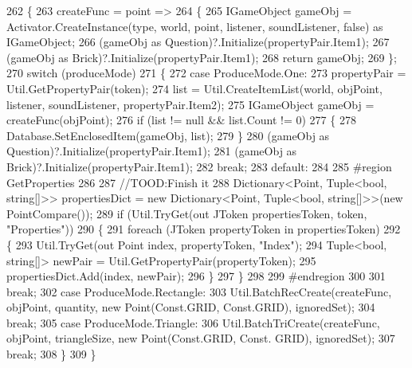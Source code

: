 \begin{DoxyCode}
262         \{
263             createFunc = point =>
264             \{
265                 IGameObject gameObj = Activator.CreateInstance(type, world, point, 
      listener, soundListener, \textcolor{keyword}{false}) as IGameObject;
266                 (gameObj as Question)?.Initialize(propertyPair.Item1);
267                 (gameObj as Brick)?.Initialize(propertyPair.Item1);
268                 \textcolor{keywordflow}{return} gameObj;
269             \};
270             \textcolor{keywordflow}{switch} (produceMode)
271             \{
272                 \textcolor{keywordflow}{case} ProduceMode.One:
273                     propertyPair = Util.GetPropertyPair(token);
274                     list = Util.CreateItemList(world, objPoint, listener, 
      soundListener, propertyPair.Item2);
275                     IGameObject gameObj = createFunc(objPoint);
276                     \textcolor{keywordflow}{if} (list != null && list.Count != 0)
277                     \{
278                         Database.SetEnclosedItem(gameObj, list);
279                     \}
280                     (gameObj as Question)?.Initialize(propertyPair.Item1);
281                     (gameObj as Brick)?.Initialize(propertyPair.Item1);
282                     \textcolor{keywordflow}{break};
283                 \textcolor{keywordflow}{default}:
284 
285 \textcolor{preprocessor}{                    #region GetProperties}
286 
287                     \textcolor{comment}{//TOOD:Finish it}
288                     Dictionary<Point, Tuple<bool, string[]>> propertiesDict = \textcolor{keyword}{new} Dictionary<Point,
       Tuple<bool, string[]>>(\textcolor{keyword}{new} PointCompare());
289                     \textcolor{keywordflow}{if} (Util.TryGet(out JToken propertiesToken, token, \textcolor{stringliteral}{"Properties"}))
290                     \{
291                         \textcolor{keywordflow}{foreach} (JToken propertyToken \textcolor{keywordflow}{in} propertiesToken)
292                         \{
293                             Util.TryGet(out Point index, propertyToken, \textcolor{stringliteral}{"Index"});
294                             Tuple<bool, string[]> newPair = Util.GetPropertyPair(propertyToken);
295                             propertiesDict.Add(index, newPair);
296                         \}
297                     \}
298 
299 \textcolor{preprocessor}{                    #endregion}
300 
301                     \textcolor{keywordflow}{break};
302                 \textcolor{keywordflow}{case} ProduceMode.Rectangle:
303                     Util.BatchRecCreate(createFunc, objPoint, quantity, \textcolor{keyword}{new} Point(Const.GRID, Const.GRID), 
      ignoredSet);
304                     \textcolor{keywordflow}{break};
305                 \textcolor{keywordflow}{case} ProduceMode.Triangle:
306                     Util.BatchTriCreate(createFunc, objPoint, triangleSize, \textcolor{keyword}{new} Point(Const.GRID, Const.
      GRID), ignoredSet);
307                     \textcolor{keywordflow}{break};
308             \}
309         \}
\end{DoxyCode}
